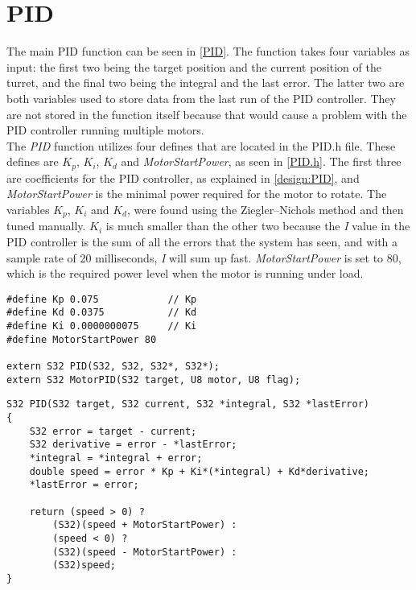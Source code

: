 \section{PID}\label{imp:PID}
The main PID function can be seen in \cref{PID}. The function takes four variables as input: the first two being the target position and the current position of the turret, and the final two being the integral and the last error. The latter two are both variables used to store data from the last run of the PID controller. They are not stored in the function itself because that would cause a problem with the PID controller running multiple motors. \\

The \emph{PID} function utilizes four defines that are located in the PID.h file. These defines are $K_p$, $K_i$, $K_d$ and \emph{MotorStartPower}, as seen in \cref{PID.h}. The first three are coefficients for the PID controller, as explained in \cref{design:PID}, and \emph{MotorStartPower} is the minimal power required for the motor to rotate. The variables $K_p$, $K_i$ and $K_d$, were found using the Ziegler–Nichols method and then tuned manually. $K_i$ is much smaller than the other two because the \emph{I} value in the PID controller is the sum of all the errors that the system has seen, and with a sample rate of 20 milliseconds, \emph{I} will sum up fast. \emph{MotorStartPower} is set to 80, which is the required power level when the motor is running under load.

\begin{lstlisting}[style=customc, label={PID.h}, caption={PID.h}]
#define Kp 0.075            // Kp
#define Kd 0.0375           // Kd
#define Ki 0.0000000075     // Ki
#define MotorStartPower 80

extern S32 PID(S32, S32, S32*, S32*);
extern S32 MotorPID(S32 target, U8 motor, U8 flag);
\end{lstlisting}


\begin{lstlisting}[style=customc, label={PID}, caption={PID code}]
S32 PID(S32 target, S32 current, S32 *integral, S32 *lastError)
{
	S32 error = target - current;
	S32 derivative = error - *lastError;
	*integral = *integral + error;
	double speed = error * Kp + Ki*(*integral) + Kd*derivative;
	*lastError = error;

	return (speed > 0) ?
        (S32)(speed + MotorStartPower) :
        (speed < 0) ?
        (S32)(speed - MotorStartPower) :
        (S32)speed;
}
\end{lstlisting}

